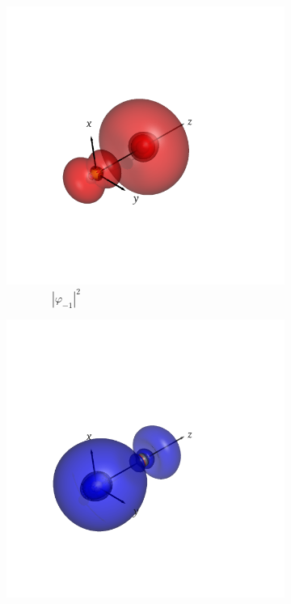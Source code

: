 \documentclass[journal=inoraj,manuscript=article]{achemso}
\begin{document}
\begin{figure}[!h]
    \vspace{0.0cm}
    \begin{subfigure}[t]{0.32\textwidth}
        \centering
        \includegraphics[width=\linewidth]{./AuPb+/nocv-1.png} 
        \caption*{\ \ \ \ \ \ \ \ $|\varphi_{-1}|^2$} 
    \end{subfigure}
    \hfill
    \begin{subfigure}[t]{0.32\textwidth}
        \centering
        \includegraphics[width=\linewidth]{./AuPb+/nocv+1.png} 

\end{subfigure}
\end{figure}
\end{document}
